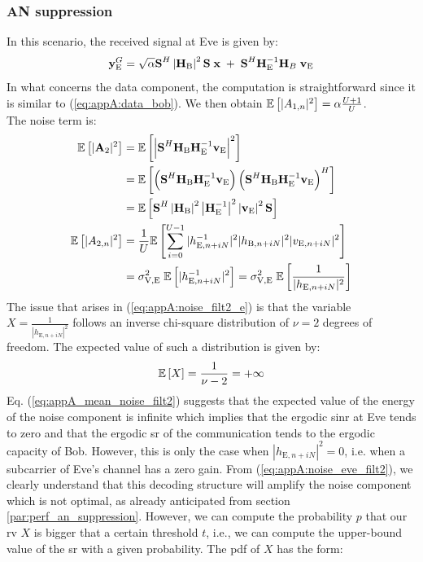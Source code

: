 \subsubsection{AN suppression}
In this scenario, the received signal at Eve is given by:
\begin{equation}
    \textbf{y}_{\text{E}}^G = \sqrt{\alpha} \textbf{S}^H \left|\textbf{H}_{\text{B}}\right|^2 \textbf{S}\; \textbf{x} \; +  \; \textbf{S}^H  \textbf{H}_{\text{E}}^{-1} \textbf{H}_B \;\textbf{v}_{\text{E}}
    \label{eq:appA:rx_eve_filt2}
\end{equation}
In what concerns the data component, the computation is straightforward since it is similar to (\ref{eq:appA:data_bob}). We then obtain $ \mathbb{E} \left[|A_{1,n}|^2\right] = \alpha \frac{U+1}{U}$.\\
The noise term is:
\begin{subequations}
    \begin{align}
        \mathbb{E} \left[|\textbf{A}_{2}|^2\right] &=  \mathbb{E} \left[\left|\textbf{S}^H \textbf{H}_{\text{B}} \textbf{H}_{\text{E}}^{-1} \textbf{v}_{\text{E}}\right|^2\right] \\
        &= \mathbb{E} \left[\left(\textbf{S}^H \textbf{H}_{\text{B}} \textbf{H}_{\text{E}}^{-1} \textbf{v}_{\text{E}} \right)\left(\textbf{S}^H \textbf{H}_{\text{B}} \textbf{H}_{\text{E}}^{-1} \textbf{v}_{\text{E}} \right)^H\right] \\
        &=\mathbb{E} \left[\textbf{S}^H   \left|\textbf{H}_{\text{B}}\right|^2 \left|\textbf{H}_{\text{E}}^{-1}\right|^2 \left|\textbf{v}_{\text{E}}\right|^2 \textbf{S} \right] \\
        \mathbb{E} \left[|A_{2,n}|^2\right] &= \frac{1}{U} \mathbb{E} \left[\sum_{i=0}^{U-1} |h_{\text{E}, n + iN}^{-1}|^2 |h_{\text{B}, n + iN}|^2 |v_{\text{E}, n + iN}|^2\right] \\
        &= \sigma^2_{\text{V,E}}\;\mathbb{E} \left[|h_{\text{E}, n + iN}^{-1}|^2\right] =  \sigma^2_{\text{V,E}} \;\mathbb{E} \left[ \frac{1}{|h_{\text{E}, n + iN}|^2}\right] \label{eq:appA:noise_filt2_e}
    \end{align}
    \label{eq:appA:noise_eve_filt2}
\end{subequations}
The issue that arises in (\ref{eq:appA:noise_filt2_e}) is that the variable $X = \frac{1}{|h_{\text{E}, n + iN}|^2}$ follows an inverse chi-square distribution of $\nu=2$ degrees of freedom. The expected value of such a distribution is given by:
\begin{equation}
    \mathbb{E} \left[X\right] = \frac{1}{\nu - 2} = + \infty
    \label{eq:appA_mean_noise_filt2}
\end{equation}
Eq. (\ref{eq:appA_mean_noise_filt2}) suggests that the expected value of the energy of the noise component is infinite which implies that the ergodic \gls{sinr} at Eve tends to zero and that the ergodic \gls{sr} of the communication tends to the ergodic capacity of Bob. However, this is only the case when $|h_{\text{E}, n + iN}|^2 = 0$, i.e. when a subcarrier of Eve's channel has a zero gain. From (\ref{eq:appA:noise_eve_filt2}), we clearly understand that this decoding structure will amplify the noise component which is not optimal, as already anticipated from section \ref{par:perf_an_suppression}. However, we can compute the probability $p$ that our \gls{rv} $X$ is bigger that a certain threshold $t$, i.e., we can compute the upper-bound value of the \gls{sr} with a given probability. The \gls{pdf} of $X$ has the form:
